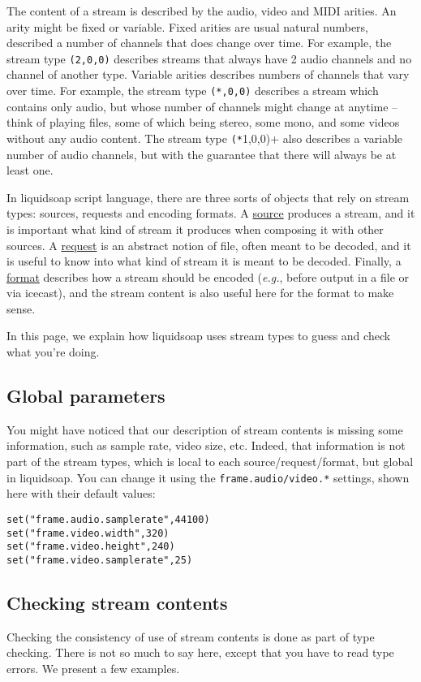 The content of a stream is described by the audio, video and MIDI
arities. An arity might be fixed or variable. Fixed arities are usual
natural numbers, described a number of channels that does change over
time. For example, the stream type \verb+(2,0,0)+ describes
streams that always have 2 audio channels and no channel of another
type. Variable arities describes numbers of channels that vary over
time. For example, the stream type \verb+(*,0,0)+ describes
a stream which contains only audio, but whose number of channels
might change at anytime -- think of playing files, some of which
being stereo, some mono, and some videos without any audio content.
The stream type \verb+(*+1,0,0)+ also describes a variable
number of audio channels, but with the guarantee that there will
always be at least one.

In liquidsoap script language, there are three sorts of objects
that rely on stream types: sources, requests and encoding formats.
A \href{sources.html}{source} produces a stream,
and it is important what kind of stream
it produces when composing it with other sources.
A \href{requests.html}{request} is an abstract notion of file,
often meant to be decoded, and it is useful to know into what
kind of stream it is meant to be decoded.
Finally, a \href{encoding_formats.html}{format} describes how a stream
should be encoded (\emph{e.g.}, before output in a file or via icecast),
and the stream content is also useful here for the format
to make sense.

In this page, we explain how liquidsoap uses stream types
to guess and check what you're doing.

\subsection{Global parameters}
You might have noticed that our description of stream contents is
missing some information, such as sample rate, video size, etc.
Indeed, that information is not part of the stream types, which is
local to each source/request/format, but global in liquidsoap.
You can change it using the \verb+frame.audio/video.*+
settings, shown here with their default values:

\begin{verbatim}
set("frame.audio.samplerate",44100)
set("frame.video.width",320)
set("frame.video.height",240)
set("frame.video.samplerate",25)
\end{verbatim}
\subsection{Checking stream contents}
Checking the consistency of use of stream contents is done as part
of type checking. There is not so much to say here, except that you
have to read type errors. We present a few examples.

